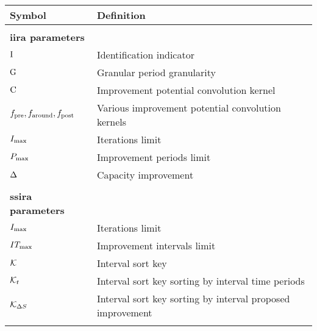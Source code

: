 \begin{table}[H]
    \centering
    \begin{tabularx}{\textwidth}{p{}p{}}
        \textbf{Symbol} & \textbf{Definition} \\
        \hline
        \\

        \textbf{\acs{iira} parameters}  & \cellrule \\
        $\mathrm{I}$ & Identification indicator \\
        $\mathrm{G}$ & Granular period granularity \\
        $\mathrm{C}$ & Improvement potential convolution kernel \\
        $f_{\text{pre}}, f_{\text{around}}, f_{\text{post}}$ & Various improvement potential convolution kernels \\
        $I_{\max}$ & Iterations limit \\
        $P_{\max}$ & Improvement periods limit \\
        $\Delta$ & Capacity improvement \\
        \\

        \textbf{\acs{ssira} parameters} & \cellrule \\
        $I_{\max}$ & Iterations limit \\
        $IT_{\max}$ & Improvement intervals limit \\
        $\mathcal{K}$ & Interval sort key \\
        $\mathcal{K}_{t}$ & Interval sort key sorting by interval time periods \\
        $\mathcal{K}_{\Delta S_{}}$ & Interval sort key sorting by interval proposed improvement \\
        \\
    \end{tabularx}
\end{table}
